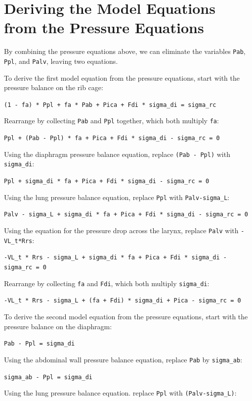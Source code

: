 \documentclass[12pt,openany,oneside]{book}
\newcommand{\ticode}[1]{\texttt{#1}}
\begin{document}
\section{Deriving the Model Equations from the Pressure Equations}

By combining the pressure equations above, we can eliminate the
variables \ticode{Pab}, \ticode{Ppl}, and \ticode{Palv}, leaving two
equations.

To derive the first model equation from the pressure equations, start
with the pressure balance on the rib cage:

\ticode{(1 - fa) * Ppl + fa * Pab + Pica + Fdi * sigma\_di = sigma\_rc}

Rearrange by collecting \ticode{Pab} and \ticode{Ppl} together, which
both multiply \ticode{fa}:

\ticode{Ppl + (Pab - Ppl) * fa + Pica + Fdi * sigma\_di - sigma\_rc = 0}

Using the diaphragm pressure balance equation, replace \ticode{(Pab -
  Ppl)} with \ticode{sigma\_di}:

\ticode{Ppl + sigma\_di * fa + Pica + Fdi * sigma\_di - sigma\_rc = 0}

Using the lung pressure balance equation, replace \ticode{Ppl} with
\ticode{Palv-sigma\_L}:

\ticode{Palv - sigma\_L + sigma\_di * fa + Pica + Fdi * sigma\_di - sigma\_rc = 0}

Using the equation for the pressure drop across the larynx, replace
\ticode{Palv} with \ticode{-VL\_t*Rrs}:

\ticode{-VL\_t * Rrs - sigma\_L + sigma\_di * fa + Pica + Fdi * sigma\_di - sigma\_rc = 0}

Rearrange by collecting \ticode{fa} and \ticode{Fdi}, which both
multiply \ticode{sigma\_di}:

\ticode{-VL\_t * Rrs - sigma\_L + (fa + Fdi) * sigma\_di + Pica - sigma\_rc = 0}


To derive the second model equation from the pressure equations, start
with the pressure balance on the diaphragm:

\ticode{Pab - Ppl = sigma\_di}

Using the abdominal wall pressure balance equation, replace
\ticode{Pab} by \ticode{sigma\_ab}:

\ticode{sigma\_ab - Ppl = sigma\_di}

Using the lung pressure balance equation. replace \ticode{Ppl} with
\ticode{(Palv-sigma\_L)}:
\end{document}
